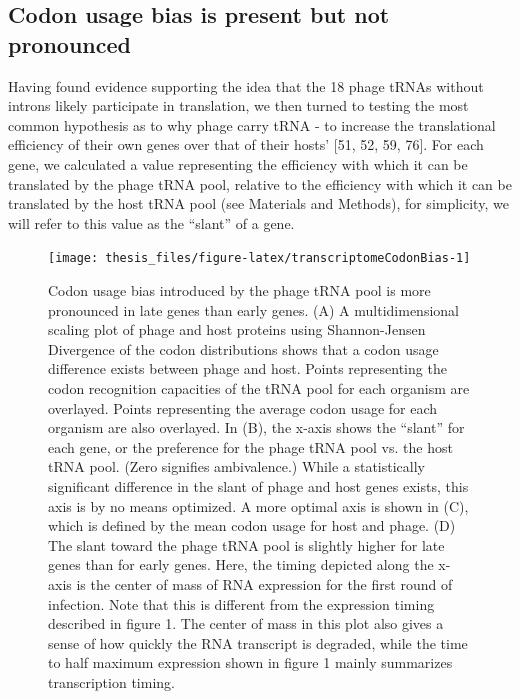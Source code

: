 \documentclass[12pt,twoside]{mitthesis-manusdown}
\begin{document}
\subsection{Codon usage bias is present but not
pronounced}\label{codon-usage-bias-is-present-but-not-pronounced}

Having found evidence supporting the idea that the 18 phage tRNAs
without introns likely participate in translation, we then turned to
testing the most common hypothesis as to why phage carry tRNA - to
increase the translational efficiency of their own genes over that of
their hosts' {[}51, 52, 59, 76{]}. For each gene, we calculated a value
representing the efficiency with which it can be translated by the phage
tRNA pool, relative to the efficiency with which it can be translated by
the host tRNA pool (see Materials and Methods), for simplicity, we will
refer to this value as the ``slant'' of a gene.
\begin{figure}[tb!]

{\centering \texttt{[image: thesis\_files/figure-latex/transcriptomeCodonBias-1]} 

}

\caption{\label{fig:transcriptomeCodonBias}Codon usage bias introduced by the phage tRNA pool is more pronounced in late genes than early genes. (A) A multidimensional scaling plot of phage and host proteins using Shannon-Jensen Divergence of the codon distributions shows that a codon usage difference exists between phage and host. Points representing the codon recognition capacities of the tRNA pool for each organism are overlayed. Points representing the average codon usage for each organism are also overlayed. In (B), the x-axis shows the “slant” for each gene, or the preference for the phage tRNA pool vs. the host tRNA pool. (Zero signifies ambivalence.) While a statistically significant difference in the slant of phage and host genes exists, this axis is by no means optimized. A more optimal axis is shown in (C), which is defined by the mean codon usage for host and phage. (D) The slant toward the phage tRNA pool is slightly higher for late genes than for early genes. Here, the timing depicted along the x-axis is the center of mass of RNA expression for the first round of infection. Note that this is different from the expression timing described in figure 1. The center of mass in this plot also gives a sense of how quickly the RNA transcript is degraded, while the time to half maximum expression shown in figure 1 mainly summarizes transcription timing.}\label{fig:transcriptomeCodonBias}
\end{figure}
\end{document}
